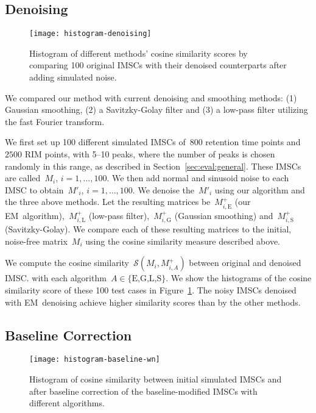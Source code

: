 \documentclass{article}
\begin{document}
\subsection{Denoising}
\label{sec:eval:denoising}

\begin{figure}[t]\centering
\texttt{[image: histogram-denoising]}
\caption{Histogram of different methods' cosine similarity scores by comparing 100 original IMSCs with their denoised counterparts after adding simulated noise.}
\label{fig:denoisingres}
\end{figure}

We compared our method with current denoising and smoothing methods:
(1) Gaussian smoothing, (2) a Savitzky-Golay filter and (3) a low-pass filter utilizing the fast Fourier transform.

We first set up 100 different simulated IMSCs of~$800$ retention time points and~$2500$ RIM points, with 5--10 peaks, where the number of peaks is chosen randomly in this range, as described in Section~\ref{sec:eval:general}. 
These IMSCs are called~$M_i$, $i=1,\dots,100$.
We then add normal and sinusoid noise to each IMSC to obtain~$M'_i$, $i=1,\dots,100$.
We denoise the~$M'_i$ using our algorithm and the three above methods.
Let the resulting matrices be~$M^+_{i,\text{E}}$ (our EM~algorithm),~$M^+_{i,\text{L}}$ (low-pass filter),~$M^+_{i,\text{G}}$ (Gaussian smoothing) and~$M^+_{i,\text{S}}$ (Savitzky-Golay).
We compare each of these resulting matrices to the initial, noise-free matrix~$M_i$ using the cosine similarity measure described above.

We compute the cosine similarity~$\mathcal{S}(M_i,M^+_{i,A})$ between original and denoised IMSC.
with each algorithm~$A\in\{\text{E,G,L,S}\}$.
We show the histograms of the cosine similarity score of these 100 test cases in Figure~\ref{fig:denoisingres}.
The noisy IMSCs denoised with EM~denoising achieve higher similarity scores than by the other methods.


\subsection{Baseline Correction}
\label{sec:eval:baseline}

\begin{figure}[t]\centering
\texttt{[image: histogram-baseline-wn]}
\caption{Histogram of cosine similarity between initial simulated IMSCs and after baseline correction of the baseline-modified IMSCs with different algorithms.}
\label{fig:baselineresults}
\end{figure}
\end{document}
